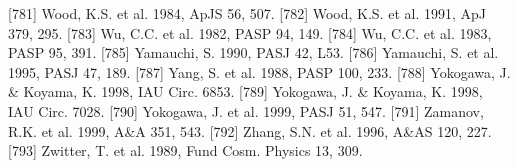 \documentclass{aa}
\begin{document}
\begin{thebibliography}{}
\bibitem[]{}[781] Wood, K.S. et al. 1984, ApJS 56, 507.
\bibitem[]{}[782] Wood, K.S. et al. 1991, ApJ 379, 295.
\bibitem[]{}[783] Wu, C.C. et al. 1982, PASP 94, 149.
\bibitem[]{}[784] Wu, C.C. et al. 1983, PASP 95, 391.
\bibitem[]{}[785] Yamauchi, S. 1990, PASJ 42, L53.
\bibitem[]{}[786] Yamauchi, S. et al. 1995, PASJ 47, 189.
\bibitem[]{}[787] Yang, S. et al. 1988, PASP 100, 233.
\bibitem[]{}[788] Yokogawa, J. \& Koyama, K. 1998, IAU Circ. 6853.
\bibitem[]{}[789] Yokogawa, J. \& Koyama, K. 1998, IAU Circ. 7028.
\bibitem[]{}[790] Yokogawa, J. et al. 1999, PASJ 51, 547.
\bibitem[]{}[791] Zamanov, R.K. et al. 1999, A\&A 351, 543.
\bibitem[]{}[792] Zhang, S.N. et al. 1996, A\&AS 120, 227.
\bibitem[]{}[793] Zwitter, T. et al. 1989, Fund Cosm. Physics 13, 309.

\end{thebibliography}
\end{document}
